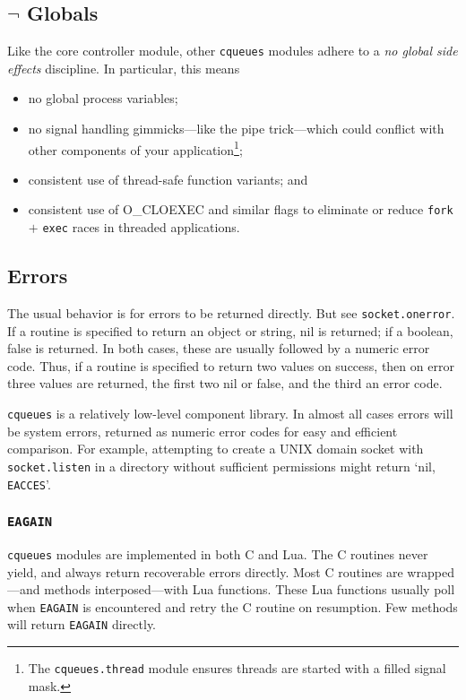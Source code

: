 \documentclass[11pt, oneside]{memoir}
\newcommand*{\cqueues}[0]{\texttt{cqueues}\xspace}
\newcommand*{\syscall}[1]{\texttt{#1}\xspace}
\newcommand*{\routine}[1]{\texttt{#1}\xspace}
\newcommand*{\module}[1]{\texttt{#1}\xspace}
\newcommand*{\errno}[1]{\texttt{#1}\xspace}
\begin{document}
\subsection{$\lnot$ Globals}

Like the core controller module, other \cqueues modules adhere to a \emph{no global side effects} discipline. In particular, this means
\begin{itemize}
\item no global process variables;
\item no signal handling gimmicks---like the pipe trick---which could conflict with other components of your application\footnote{The \module{cqueues.thread} module ensures threads are started with a filled signal mask.};
\item consistent use of thread-safe function variants; and
\item consistent use of O\_CLOEXEC and similar flags to eliminate or reduce \syscall{fork} $+$ \syscall{exec} races in threaded applications.
\end{itemize}

\subsection{Errors}

The usual behavior is for errors to be returned directly. But see \routine{socket.onerror}. If a routine is specified to return an object or string, nil is returned; if a boolean, false is returned. In both cases, these  are usually followed by a numeric error code. Thus, if a routine is specified to return two values on success, then on error three values are returned, the first two nil or false, and the third an error code.

\cqueues is a relatively low-level component library. In almost all cases errors will be system errors, returned as numeric error codes for easy and efficient comparison. For example, attempting to create a UNIX domain socket with \routine{socket.listen} in a directory without sufficient permissions might return `nil, \errno{EACCES}'.

\subsubsection{\texttt{EAGAIN}}

\cqueues modules are implemented in both C and Lua. The C routines never yield, and always return recoverable errors directly. Most C routines are wrapped---and methods interposed---with Lua functions. These Lua functions usually poll when \errno{EAGAIN} is encountered and retry the C routine on resumption. Few methods will return \errno{EAGAIN} directly.
\end{document}
